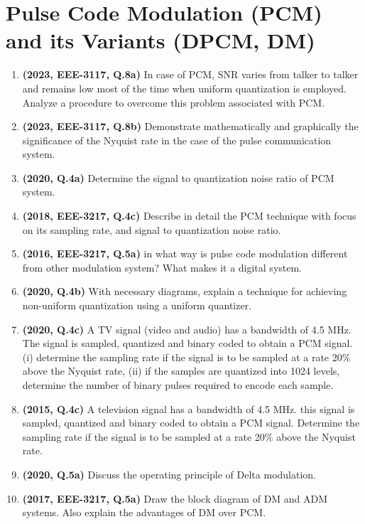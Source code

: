 \documentclass[12pt, a4paper]{article}
\begin{document}
	\section{Pulse Code Modulation (PCM) and its Variants (DPCM, DM)}
	\begin{enumerate}
		\item \textbf{(2023, EEE-3117, Q.8a)} In case of PCM, SNR varies from talker to talker and remains low most of the time when uniform quantization is employed. Analyze a procedure to overcome this problem associated with PCM.
		\item \textbf{(2023, EEE-3117, Q.8b)} Demonstrate mathematically and graphically the significance of the Nyquist rate in the case of the pulse communication system.
		\item \textbf{(2020, Q.4a)} Determine the signal to quantization noise ratio of PCM system.
		\item \textbf{(2018, EEE-3217, Q.4c)} Describe in detail the PCM technique with focus on its sampling rate, and signal to quantization noise ratio.
		\item \textbf{(2016, EEE-3217, Q.5a)} in what way is pulse code modulation different from other modulation system? What makes it a digital system.
		
		\item \textbf{(2020, Q.4b)} With necessary diagrams, explain a technique for achieving non-uniform quantization using a uniform quantizer.
		
		\item \textbf{(2020, Q.4c)} A TV signal (video and audio) has a bandwidth of 4.5 MHz. The signal is sampled, quantized and binary coded to obtain a PCM signal. (i) determine the sampling rate if the signal is to be sampled at a rate 20\% above the Nyquist rate, (ii) if the samples are quantized into 1024 levels, determine the number of binary pulses required to encode each sample.
		\item \textbf{(2015, Q.4c)} A television signal has a bandwidth of 4.5 MHz. this signal is sampled, quantized and binary coded to obtain a PCM signal. Determine the sampling rate if the signal is to be sampled at a rate 20\% above the Nyquist rate.
		
		\item \textbf{(2020, Q.5a)} Discuss the operating principle of Delta modulation.
		\item \textbf{(2017, EEE-3217, Q.5a)} Draw the block diagram of DM and ADM systems. Also explain the advantages of DM over PCM.
		

\end{enumerate}
\end{document}
